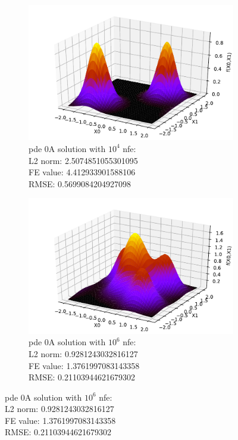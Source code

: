 \documentclass[./\jobname.tex]{subfiles}
\begin{document}
\begin{figure}[H]
	\centering
	\begin{subfigure}[b]{0.5\linewidth}
		\centering
		\includegraphics[width=1\textwidth]{../../code/experiments/experiment_0/pde0a_missing_bump_sol_10_4.pdf}
		\caption{\gls{pde} 0A solution with $10^4$ \gls{nfe}: \\ L2 norm: 2.5074851055301095 \\ FE value: 4.412933901588106 \\ RMSE: 0.5699084204927098}
		\label{fig:pde0a_sol_10_4}
	\end{subfigure}%
	\begin{subfigure}[b]{0.5\linewidth}
		\centering
		\includegraphics[width=1\textwidth]{../../code/experiments/experiment_0/pde0a_missing_bump_sol_10_6.pdf}
		\caption{\gls{pde} 0A solution with $10^6$ \gls{nfe}: \\ L2 norm: 0.9281243032816127 \\ FE value: 1.3761997083143358 \\ RMSE: 0.21103944621679302}
		\label{fig:pde0a_sol_10_6}
	\end{subfigure}%
	\label{fig:serial_jade_pde0a_sol_comparison}
\end{figure}
\end{document}
